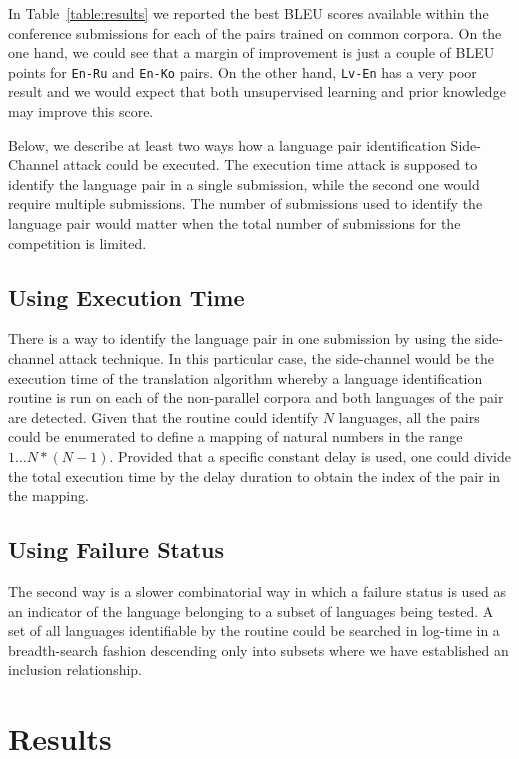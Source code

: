 \documentclass[]{article}
\begin{document}
In Table~\ref{table:results} we reported the best BLEU scores available within the conference submissions for each of the pairs trained on common corpora.
On the one hand, we could see that a margin of improvement is just a couple of BLEU points for {\tt En-Ru} and {\tt En-Ko} pairs.
On the other hand, {\tt Lv-En} has a very poor result and we would expect that both unsupervised learning and prior knowledge may improve this score.

Below, we describe at least two ways how a language pair identification Side-Channel attack could be executed.
The execution time attack is supposed to identify the language pair in a single submission, while the second one would require multiple submissions.
The number of submissions used to identify the language pair would matter when the total number of submissions for the competition is limited.

\subsection{Using Execution Time}
\label{sect:execution_time_attack}

There is a way to identify the language pair in one submission by using the side-channel attack technique.
In this particular case, the side-channel would be the execution time of the translation algorithm whereby a language identification routine is run on each of the non-parallel corpora and both languages of the pair are detected.
Given that the routine could identify $N$ languages, all the pairs could be enumerated to define a mapping of natural numbers in the range $1\dots N*(N-1)$.
Provided that a specific constant delay is used, one could divide the total execution time by the delay duration to obtain the index of the pair in the mapping.

\subsection{Using Failure Status}
\label{sect:failure_status_attack}

The second way is a slower combinatorial way in which a failure status is used as an indicator of the language belonging to a subset of languages being tested.
A set of all languages identifiable by the routine could be searched in log-time in a breadth-search fashion descending only into subsets where we have established an inclusion relationship.

\section{Results}
\label{sect:results}
\end{document}
